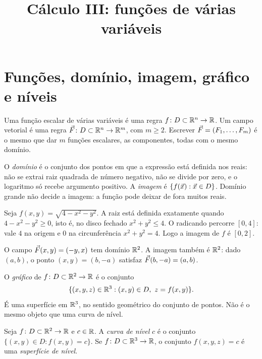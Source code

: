 \documentclass[11pt,a4paper]{article}
\title{Cálculo III: funções de várias variáveis}
\author{}
\date{}
\begin{document}
\maketitle
\tableofcontents

\section{Funções, domínio, imagem, gráfico e níveis}


Uma função escalar de várias variáveis é uma regra $f\colon D\subset\mathbb{R}^n\to\mathbb{R}$. Um campo vetorial é uma regra $\vec{F}\colon D\subset\mathbb{R}^n\to\mathbb{R}^m$, com $m\ge 2$. Escrever $\vec{F}=(F_1,\ldots,F_m)$ é o mesmo que dar $m$ funções escalares, as componentes, todas com o mesmo domínio.

O \emph{domínio} é o conjunto dos pontos em que a expressão está definida nos reais: não se extrai raiz quadrada de número negativo, não se divide por zero, e o logaritmo só recebe argumento positivo. A \emph{imagem} é $\{f(\vec{x}):\vec{x}\in D\}$. Domínio grande não decide a imagem: a função pode deixar de fora muitos reais.

\begin{exemplo}
Seja $f(x,y)=\sqrt{4-x^2-y^2}$. A raiz está definida exatamente quando $4-x^2-y^2\ge 0$, isto é, no disco fechado $x^2+y^2\le 4$. O radicando percorre $[0,4]$: vale $4$ na origem e $0$ na circunferência $x^2+y^2=4$. Logo a imagem de $f$ é $[0,2]$.

O campo $\vec{F}(x,y)=(-y,x)$ tem domínio $\mathbb{R}^2$. A imagem também é $\mathbb{R}^2$: dado $(a,b)$, o ponto $(x,y)=(b,-a)$ satisfaz $\vec{F}(b,-a)=(a,b)$.
\end{exemplo}

O \emph{gráfico} de $f\colon D\subset\mathbb{R}^2\to\mathbb{R}$ é o conjunto
\[
\{(x,y,z)\in\R^3:(x,y)\in D,\ z=f(x,y)\}.
\]
É uma superfície em $\mathbb{R}^3$, no sentido geométrico do conjunto de pontos. Não é o mesmo objeto que uma curva de nível.

\begin{definicao}
Seja $f\colon D\subset\mathbb{R}^2\to\mathbb{R}$ e $c\in\mathbb{R}$. A \emph{curva de nível} $c$ é o conjunto $\{(x,y)\in D:f(x,y)=c\}$. Se $f\colon D\subset\mathbb{R}^3\to\mathbb{R}$, o conjunto $f(x,y,z)=c$ é uma \emph{superfície de nível}.
\end{definicao}
\end{document}
